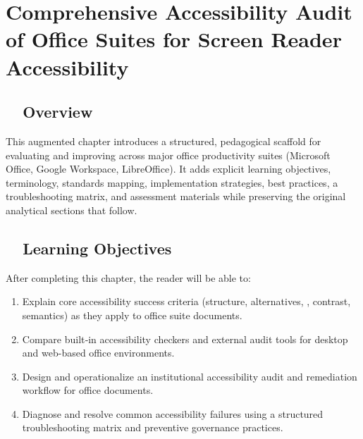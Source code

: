 \chapter{Comprehensive Accessibility Audit of Office Suites for Screen Reader Accessibility}

\section{~~Overview}\label{ch20:sec:overview}
This augmented chapter introduces a structured, pedagogical scaffold for evaluating and improving   across major office productivity suites (Microsoft Office, Google Workspace, LibreOffice). It adds explicit learning objectives, terminology, standards mapping, implementation strategies, best practices, a troubleshooting matrix, and assessment materials while preserving the original analytical sections that follow.

\section{~~Learning Objectives}\label{ch20:sec:learning-objectives}
After completing this chapter, the reader will be able to:
\begin{enumerate}
	\item Explain core accessibility success criteria (structure, alternatives, , contrast, semantics) as they apply to office suite documents.
	\item Compare built‑in accessibility checkers and external audit tools for desktop and web-based office environments.
	\item Design and operationalize an institutional accessibility audit and remediation workflow for office documents.
	\item Diagnose and resolve common accessibility failures using a structured troubleshooting matrix and preventive governance practices.
\end{enumerate}

